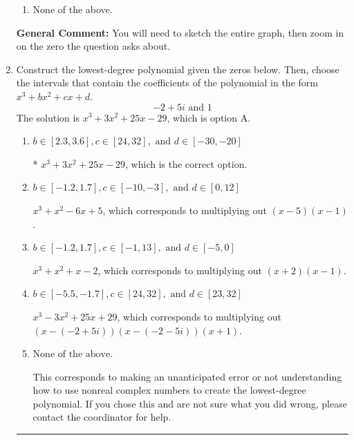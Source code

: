 \documentclass{extbook}[14pt]
\newcommand{\litem}[1]{\item #1

\rule{\textwidth}{0.4pt}}
\begin{document}
\begin{enumerate}
{\begin{enumerate}[label=\Alph*.]
\item None of the above.\end{enumerate}
\textbf{General Comment:} You will need to sketch the entire graph, then zoom in on the zero the question asks about.
}
\litem{
Construct the lowest-degree polynomial given the zeros below. Then, choose the intervals that contain the coefficients of the polynomial in the form $x^3+bx^2+cx+d$.
\[ -2 + 5 i \text{ and } 1 \]The solution is \( x^{3} +3 x^{2} +25 x -29 \), which is option A.\begin{enumerate}[label=\Alph*.]
\item \( b \in [2.3, 3.6], c \in [24, 32], \text{ and } d \in [-30, -20] \)

* $x^{3} +3 x^{2} +25 x -29$, which is the correct option.
\item \( b \in [-1.2, 1.7], c \in [-10, -3], \text{ and } d \in [0, 12] \)

$x^{3} + x^{2} -6 x + 5$, which corresponds to multiplying out $(x -5)(x -1)$.
\item \( b \in [-1.2, 1.7], c \in [-1, 13], \text{ and } d \in [-5, 0] \)

$x^{3} + x^{2} +x -2$, which corresponds to multiplying out $(x + 2)(x -1)$.
\item \( b \in [-5.5, -1.7], c \in [24, 32], \text{ and } d \in [23, 32] \)

$x^{3} -3 x^{2} +25 x + 29$, which corresponds to multiplying out $(x-(-2 + 5 i))(x-(-2 - 5 i))(x + 1)$.
\item \( \text{None of the above.} \)

This corresponds to making an unanticipated error or not understanding how to use nonreal complex numbers to create the lowest-degree polynomial. If you chose this and are not sure what you did wrong, please contact the coordinator for help.
\end{enumerate}

}
\end{enumerate}
\end{document}
